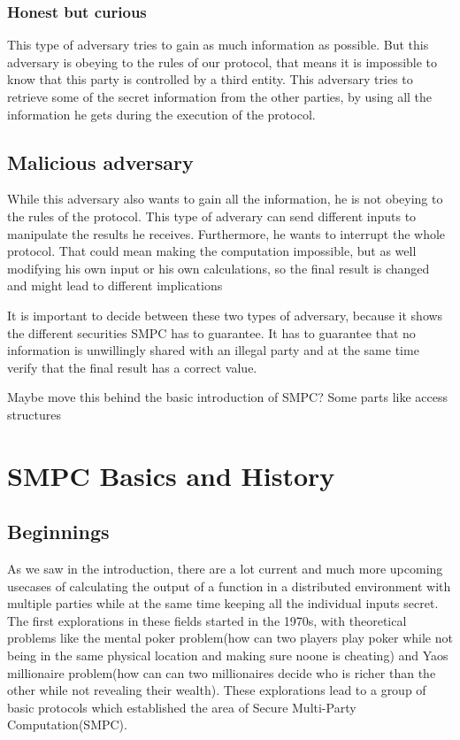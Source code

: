 \documentclass[english,runningheads,a4paper]{llncs}[2018/03/10]
\begin{document}
\subsubsection{Honest but curious}
This type of adversary tries to gain as much information as possible. But this adversary is obeying to the rules of our protocol, that means it is impossible to know that this party is controlled by a third entity. This adversary tries to retrieve some of the secret information from the other parties, by using all the information he gets during the execution of the protocol.

\subsection{Malicious adversary}
While this adversary also wants to gain all the information, he is not obeying to the rules of the protocol. This type of adverary can send different inputs to manipulate the results he receives. Furthermore, he wants to interrupt the whole protocol. That could mean making the computation impossible, but as well modifying his own input or his own calculations, so the final result is changed and might lead to different implications

It is important to decide between these two types of adversary, because it shows the different securities SMPC has to guarantee. It has to guarantee that no information is unwillingly shared with an illegal party and at the same time verify that the final result has a correct value.


Maybe move this behind the basic introduction of SMPC? Some parts like access structures 



\section{SMPC Basics and History}\label{sec:smpc}
\subsection{Beginnings}
As we saw in the introduction, there are a lot current and much more upcoming usecases of calculating the output of a function in a distributed environment with multiple parties while at the same time keeping all the individual inputs secret. The first explorations in these fields started in the 1970s, with theoretical problems like the mental poker problem(how can two players play poker while not being in the same physical location and making sure noone is cheating) and Yaos millionaire problem(how can can two millionaires decide who is richer than the other while not revealing their wealth). \newline
These explorations lead to a group of basic protocols which established the area of Secure Multi-Party Computation(SMPC).
\end{document}
